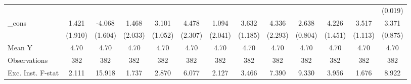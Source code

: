 {\begin{tabular}{l*{12}{c}}
            &                     &                     &                     &                     &                     &                     &                     &                     &                     &                     &                     &     (0.019)         \\
\addlinespace
\_cons      &       1.421         &      -4.068\sym{**} &       1.468         &       3.101\sym{***}&       4.478\sym{*}  &       1.094         &       3.632\sym{***}&       4.336\sym{*}  &       2.638\sym{***}&       4.226\sym{***}&       3.517\sym{***}&       3.371\sym{***}\\
            &     (1.910)         &     (1.604)         &     (2.033)         &     (1.052)         &     (2.307)         &     (2.041)         &     (1.185)         &     (2.293)         &     (0.804)         &     (1.451)         &     (1.113)         &     (0.875)         \\
\midrule
Mean Y      &        4.70         &        4.70         &        4.70         &        4.70         &        4.70         &        4.70         &        4.70         &        4.70         &        4.70         &        4.70         &        4.70         &        4.70         \\
Observations&         382         &         382         &         382         &         382         &         382         &         382         &         382         &         382         &         382         &         382         &         382         &         382         \\
Exc. Inst. F-stat&       2.111         &      15.918         &       1.737         &       2.870         &       6.077         &       2.127         &       3.466         &       7.390         &       9.330         &       3.956         &       1.676         &       8.922         \\
\bottomrule
\end{tabular}
}
